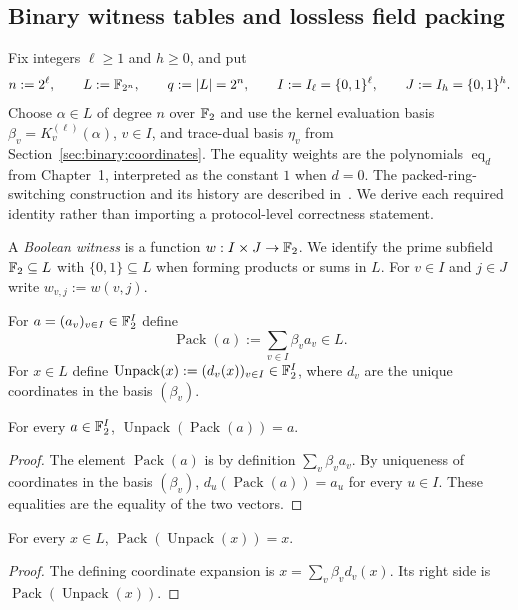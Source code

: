 \subsection{Binary witness tables and lossless field packing}\label{sec:packing:tables}
Fix integers $\ell\geq1$ and $h\geq0$, and put
\[
 n:=2^\ell,\qquad L:=\mathbb{F}_{2^n},\qquad q:=|L|=2^n,\qquad
 I:=I_\ell=\{0,1\}^\ell,\qquad J:=I_h=\{0,1\}^h.
\]
Choose $\alpha\in L$ of degree $n$ over $\mathbb{F}_2$ and use the
kernel evaluation basis $\beta_v=K_v^{(\ell)}(\alpha)$,
$v\in I$, and trace-dual basis $\eta_v$ from
Section~\ref{sec:binary:coordinates}.
The equality weights are the polynomials
$\operatorname{eq}_d$ from Chapter~1, interpreted as
the constant $1$ when $d=0$.
The packed-ring-switching construction and its history
are described in~\cite{DiamondPosen2024}.
We derive each required identity rather than importing
a protocol-level correctness statement.

\begin{definition}\label{def:pack:witness}
A \emph{Boolean witness} is a function
$w:I\times J\to\mathbb{F}_2$. We identify the prime subfield
$\mathbb{F}_2\subseteq L$ with $\{0,1\}\subseteq L$
when forming products or sums in $L$.
For $v\in I$ and $j\in J$ write $w_{v,j}:=w(v,j)$.
\end{definition}

\begin{definition}\label{def:pack:pack}
For $a=(a_v)_{v\in I}\in\mathbb{F}_2^I$ define
\[
 \operatorname{Pack}(a):=\sum_{v\in I}\beta_v a_v\in L.
\]
For $x\in L$ define
$\operatorname{Unpack}(x):=(d_v(x))_{v\in I}\in\mathbb{F}_2^I$,
where $d_v$ are the unique coordinates in the basis
$(\beta_v)$.
\end{definition}

\begin{lemma}\label{lem:pack:unpack-pack}
For every $a\in\mathbb{F}_2^I$,
$\operatorname{Unpack}(\operatorname{Pack}(a))=a$.
\end{lemma}
\begin{proof}
The element $\operatorname{Pack}(a)$ is by definition
$\sum_v\beta_va_v$. By uniqueness of coordinates
in the basis $(\beta_v)$,
$d_u(\operatorname{Pack}(a))=a_u$ for every $u\in I$.
These equalities are the equality of the two vectors.
\end{proof}

\begin{lemma}\label{lem:pack:pack-unpack}
For every $x\in L$,
$\operatorname{Pack}(\operatorname{Unpack}(x))=x$.
\end{lemma}
\begin{proof}
The defining coordinate expansion is
$x=\sum_v\beta_vd_v(x)$. Its right side is
$\operatorname{Pack}(\operatorname{Unpack}(x))$.
\end{proof}

